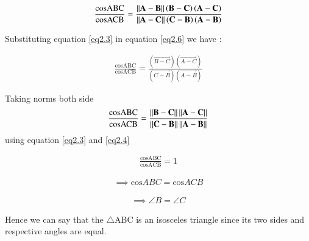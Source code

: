 \documentclass[journal,12pt,twocolumn]{IEEEtran}
\begin{document}
  \begin{align}
 \frac{\text{cosABC}}{\text{cosACB}} = \frac{ \left\lVert\mathbf{A-B}\right\rVert  \left( \mathbf{B - C } \right)  \left( \mathbf{A - C } \right) }{\left\lVert \mathbf{A-C}\right\rVert  \left( \mathbf{C - B } \right)  \left( \mathbf{A - B } \right)   } \label{eq2.6}
 \end{align} 
 
 
 Substituting equation \ref{eq2.3} in equation \ref{eq2.6} we have :
 
    \begin{align}
  \frac{\text{cosABC}}{\text{cosACB}} = \frac{ \left( \vec{B - C } \right)  \left( \vec{A - C } \right) }{ \left( \vec{C - B } \right)  \left( \vec{A - B } \right)   } \label{eq2.7}
  \end{align}
  
  Taking norms both side 
  \begin{align}
  \frac{\text{cosABC}}{\text{cosACB}} = \frac{ \left\lVert\mathbf{B - C }\right\rVert \left\lVert\mathbf{A - C } \right\rVert } { \left\lVert\mathbf{C - B }\right\rVert  \left\lVert\mathbf{A - B } \right\rVert } \label{eq2.8}
  \end{align}
   using equation \ref{eq2.3} and \ref{eq2.4} 
  
    \begin{align}
  \frac{\text{cosABC}}{\text{cosACB}} = 1 \label{eq2.9}
  \end{align}
  
   \begin{align}
  \implies   \text{cos}ABC =  \text{cos}ACB \label{eq2.10}
  \end{align}
  
     \begin{align}
  \implies \angle{B}   =  \angle{C} \label{eq2.11}
  \end{align}
  
  Hence we can say that the $\triangle$ABC is an isosceles triangle since its two sides and respective angles are equal.
  
  
  
  
  
  
    

  
  
  
  
\end{document}
